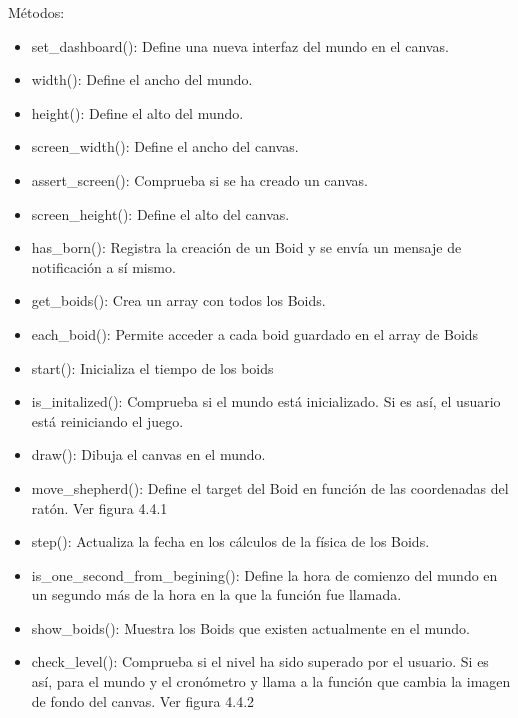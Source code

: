 Métodos:
\begin{itemize}
 \item set\_dashboard():
Define una nueva interfaz del mundo en el canvas.

 \item width():
Define el ancho del mundo.

 \item height():
Define el alto del mundo.

 \item screen\_width():
Define el ancho del canvas.

 \item assert\_screen():
Comprueba si se ha creado un canvas.

 \item screen\_height():
Define el alto del canvas.

 \item has\_born():
Registra la creación de un Boid y se envía un mensaje de notificación a sí mismo.

 \item get\_boids():
Crea un array con todos los Boids.

 \item each\_boid():
Permite acceder a cada boid guardado en el array de Boids

 \item start():
Inicializa el tiempo de los boids

 \item is\_initalized():
Comprueba si el mundo está inicializado. Si es así, el usuario está reiniciando el juego.

 \item draw():
Dibuja el canvas en el mundo.

 \item move\_shepherd():
Define el target del Boid en función de las coordenadas del ratón. Ver figura 4.4.1

 \item step():
Actualiza la fecha en los cálculos de la física de los Boids.

 \item is\_one\_second\_from\_begining():
Define la hora de comienzo del mundo en un segundo más de la hora en la que la función fue llamada.

 \item show\_boids():
Muestra los Boids que existen actualmente en el mundo.

 \item check\_level():
Comprueba si el nivel ha sido superado por el usuario. Si es así, para el mundo y el cronómetro y llama a la función que cambia la imagen 
de fondo del canvas. Ver figura 4.4.2


\end{itemize}
